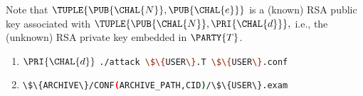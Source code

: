 
%
Note that
$
\TUPLE{ \PUB{\CHAL{N}}, \PUB{\CHAL{e}} }
$
is
a     (known) RSA public  key 
associated with 
$
\TUPLE{ \PUB{\CHAL{N}}, \PRI{\CHAL{d}} } ,
$
i.e.,
the (unknown) RSA private key embedded in $\PARTY{T}$.



\begin{enumerate}
\item \DESCTASKIMPL
      {$\PRI{\CHAL{d}}$}
      {\mbox{\lstinline[language={bash}]|./attack \$\{USER\}.T \$\{USER\}.conf|}}
\item \DESCTASKEXAM
      {\mbox{\lstinline[language={bash}]|\$\{ARCHIVE\}/CONF(ARCHIVE_PATH,CID)/\$\{USER\}.exam|}}
\end{enumerate}

